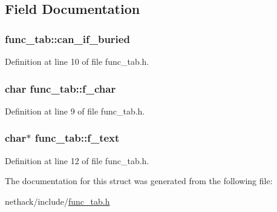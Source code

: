 \subsection{Field Documentation}
\hypertarget{structfunc__tab_a72d2ab6fcafa6adb5aec8c0749a0c7fa}{
\subsubsection[{can\+\_\+if\+\_\+buried}]{ func\+\_\+tab\+::can\+\_\+if\+\_\+buried}}\label{structfunc__tab_a72d2ab6fcafa6adb5aec8c0749a0c7fa}


Definition at line 10 of file func\+\_\+tab.\+h.

\hypertarget{structfunc__tab_a67296fe6345240da4d9cdc58f91b267b}{
\subsubsection[{f\+\_\+char}]{\setlength{\rightskip}{0pt plus 5cm}char func\+\_\+tab\+::f\+\_\+char}}\label{structfunc__tab_a67296fe6345240da4d9cdc58f91b267b}


Definition at line 9 of file func\+\_\+tab.\+h.

\hypertarget{structfunc__tab_ae0425af08ab5f14c0ceced4fc98ed727}{
\subsubsection[{f\+\_\+text}]{ char$\ast$ func\+\_\+tab\+::f\+\_\+text}}\label{structfunc__tab_ae0425af08ab5f14c0ceced4fc98ed727}


Definition at line 12 of file func\+\_\+tab.\+h.



The documentation for this struct was generated from the following file\+:\begin{DoxyCompactItemize}
\item 
nethack/include/\hyperlink{func__tab_8h}{func\+\_\+tab.\+h}\end{DoxyCompactItemize}
